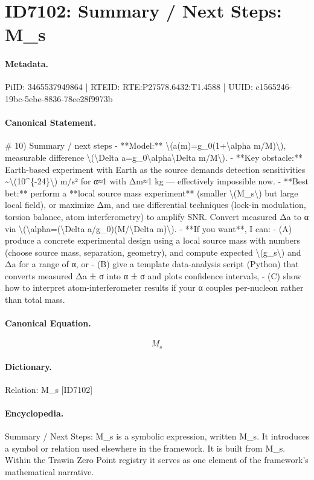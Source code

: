 \section*{ID7102: Summary / Next Steps: M\_s}
\paragraph{Metadata.}
PiID: 3465537949864 | RTEID: RTE:P27578.6432:T1.4588 | UUID: c1565246-19bc-5ebe-8836-78ee28f9973b

\paragraph{Canonical Statement.}
\# 10) Summary / next steps - **Model:** \textbackslash{}(a(m)=g\_0(1+\textbackslash{}alpha m/M)\textbackslash{}), measurable difference \textbackslash{}(\textbackslash{}Delta a=g\_0\textbackslash{}alpha\textbackslash{}Delta m/M\textbackslash{}). - **Key obstacle:** Earth-based experiment with Earth as the source demands detection sensitivities \textasciitilde{}\textbackslash{}(10\textasciicircum{}\{-24\}\textbackslash{}) m/s² for α≈1 with Δm≈1 kg — effectively impossible now. - **Best bet:** perform a **local source mass experiment** (smaller \textbackslash{}(M\_s\textbackslash{}) but large local field), or maximize Δm, and use differential techniques (lock-in modulation, torsion balance, atom interferometry) to amplify SNR. Convert measured Δa to α via \textbackslash{}(\textbackslash{}alpha=(\textbackslash{}Delta a/g\_0)(M/\textbackslash{}Delta m)\textbackslash{}). - **If you want**, I can: - (A) produce a concrete experimental design using a local source mass with numbers (choose source mass, separation, geometry), and compute expected \textbackslash{}(g\_s\textbackslash{}) and Δa for a range of α, or - (B) give a template data-analysis script (Python) that converts measured Δa ± σ into α ± σ and plots confidence intervals, - (C) show how to interpret atom-interferometer results if your α couples per-nucleon rather than total mass.

\paragraph{Canonical Equation.}
\[
M_s
\]

\paragraph{Dictionary.}
Relation: M\_s [ID7102]

\paragraph{Encyclopedia.}
Summary / Next Steps: M\_s is a symbolic expression, written M\_s. It introduces a symbol or relation used elsewhere in the framework. It is built from M\_s. Within the Trawin Zero Point registry it serves as one element of the framework's mathematical narrative.
